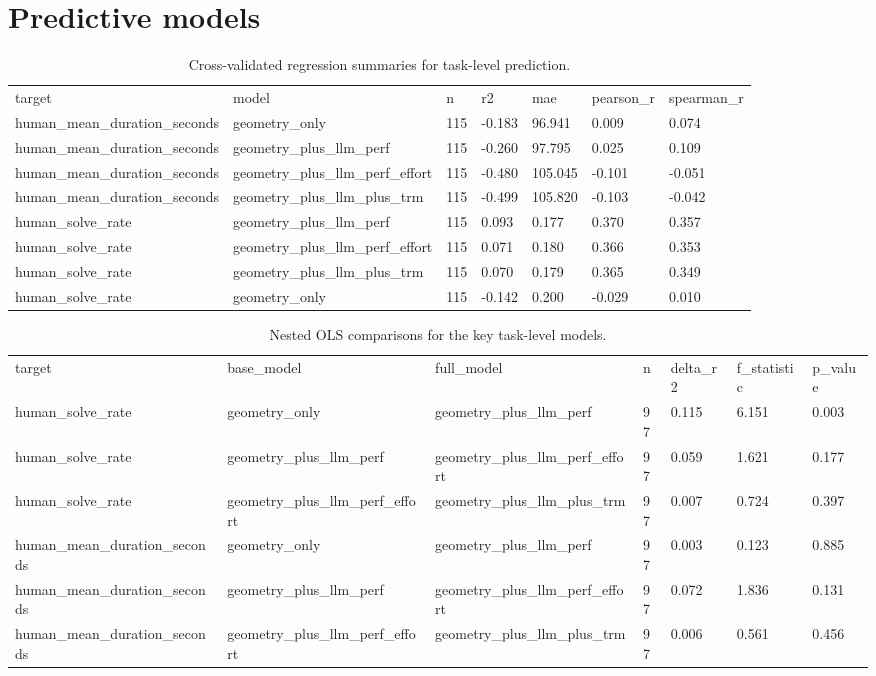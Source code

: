 \documentclass[11pt]{article}
\begin{document}
\section{Predictive models}
\begin{table}[htbp]
\centering
\caption{Cross-validated regression summaries for task-level prediction.}
\label{tab:regression_summary}
\begin{tabular}{lllllll}
\toprule
target & model & n & r2 & mae & pearson\_r & spearman\_r \\
human\_mean\_duration\_seconds & geometry\_only & 115 & -0.183 & 96.941 & 0.009 & 0.074 \\
human\_mean\_duration\_seconds & geometry\_plus\_llm\_perf & 115 & -0.260 & 97.795 & 0.025 & 0.109 \\
human\_mean\_duration\_seconds & geometry\_plus\_llm\_perf\_effort & 115 & -0.480 & 105.045 & -0.101 & -0.051 \\
human\_mean\_duration\_seconds & geometry\_plus\_llm\_plus\_trm & 115 & -0.499 & 105.820 & -0.103 & -0.042 \\
human\_solve\_rate & geometry\_plus\_llm\_perf & 115 & 0.093 & 0.177 & 0.370 & 0.357 \\
human\_solve\_rate & geometry\_plus\_llm\_perf\_effort & 115 & 0.071 & 0.180 & 0.366 & 0.353 \\
human\_solve\_rate & geometry\_plus\_llm\_plus\_trm & 115 & 0.070 & 0.179 & 0.365 & 0.349 \\
human\_solve\_rate & geometry\_only & 115 & -0.142 & 0.200 & -0.029 & 0.010 \\
\bottomrule
\end{tabular}
\end{table}
\begin{table}[htbp]
\centering
\caption{Nested OLS comparisons for the key task-level models.}
\label{tab:regression_compare}
\begin{tabular}{lllllll}
\toprule
target & base\_model & full\_model & n & delta\_r2 & f\_statistic & p\_value \\
human\_solve\_rate & geometry\_only & geometry\_plus\_llm\_perf & 97 & 0.115 & 6.151 & 0.003 \\
human\_solve\_rate & geometry\_plus\_llm\_perf & geometry\_plus\_llm\_perf\_effort & 97 & 0.059 & 1.621 & 0.177 \\
human\_solve\_rate & geometry\_plus\_llm\_perf\_effort & geometry\_plus\_llm\_plus\_trm & 97 & 0.007 & 0.724 & 0.397 \\
human\_mean\_duration\_seconds & geometry\_only & geometry\_plus\_llm\_perf & 97 & 0.003 & 0.123 & 0.885 \\
human\_mean\_duration\_seconds & geometry\_plus\_llm\_perf & geometry\_plus\_llm\_perf\_effort & 97 & 0.072 & 1.836 & 0.131 \\
human\_mean\_duration\_seconds & geometry\_plus\_llm\_perf\_effort & geometry\_plus\_llm\_plus\_trm & 97 & 0.006 & 0.561 & 0.456 \\
\bottomrule
\end{tabular}
\end{table}
\end{document}
